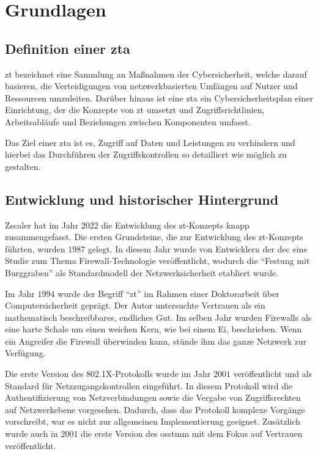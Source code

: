 \newpage


\section{Grundlagen}\label{sec:grundlagen}
\subsection[Definition einer Zero-Trust-Architektur]{Definition einer \ac{zta}}\label{subsec:definition-einer-zta}
\ac{zt} bezeichnet eine Sammlung an Maßnahmen der Cybersicherheit, welche darauf basieren, die Verteidigungen von netzwerkbasierten Umfängen auf Nutzer und Ressourcen umzuleiten\autocite[\vglf][]{NIST:800207}.
Darüber hinaus ist eine \ac{zta} ein Cybersicherheitsplan einer Einrichtung, der die Konzepte von \ac{zt} umsetzt und Zugriffsrichtlinien, Arbeitsabläufe und Beziehungen zwischen Komponenten umfasst.\autocite[\vglf][]{NIST:800207}

Das Ziel einer \ac{zta} ist es,  Zugriff auf Daten und Leistungen zu verhindern und hierbei das Durchführen der Zugriffskontrollen so detailliert wie möglich zu gestalten.


\subsection{Entwicklung und historischer Hintergrund}\label{subsec:entwicklung-und-historischer-hintergrund}
Zscaler hat im Jahr 2022 die Entwicklung des \ac{zt}-Konzepts knapp zusammengefasst.\autocites[\vglf][]{zscaler-2022b}
Die ersten Grundsteine, die zur Entwicklung des \ac{zt}-Konzepts führten, wurden $1987$ gelegt.
In diesem Jahr wurde von Entwicklern der \ac{dec} eine Studie zum Thema Firewall-Technologie veröffentlicht, wodurch die \enquote{Festung mit Burggraben} als Standardmodell der Netzwerksicherheit etabliert wurde.\autocites[\vglf][]{zscaler-2022b}

Im Jahr $1994$ wurde der Begriff \enquote{\ac{zt}} im Rahmen einer Doktorarbeit über Computersicherheit geprägt.
Der Autor untersuchte Vertrauen als ein mathematisch beschreibbares, endliches Gut.\autocite[\vglf][]{marsh-1994}
Im selben Jahr wurden Firewalls als eine harte Schale um einen weichen Kern, wie bei einem Ei, beschrieben.
Wenn ein Angreifer die Firewall überwinden kann, stünde ihm das ganze Netzwerk zur Verfügung. \autocite[\vglf][]{world-1994}

Die erste Version des 802.1X-Protokolls\autocite[\vglf][]{IEEE-2001} wurde im Jahr $2001$ veröffentlicht und als Standard für Netzzugangskontrollen eingeführt.
In diesem Protokoll wird die Authentifizierung von Netzverbindungen sowie die Vergabe von Zugriffsrechten auf Netzwerkebene vorgesehen.
Dadurch, dass das Protokoll komplexe Vorgänge vorschreibt, war es nicht zur allgemeinen Implementierung geeignet.\autocite[\vglf][]{zscaler-2022b}
Zusätzlich wurde auch in $2001$ die erste Version des \ac{osstmm} mit dem Fokus auf Vertrauen veröffentlicht.\autocite[\vglf][]{osstmm-2001}

